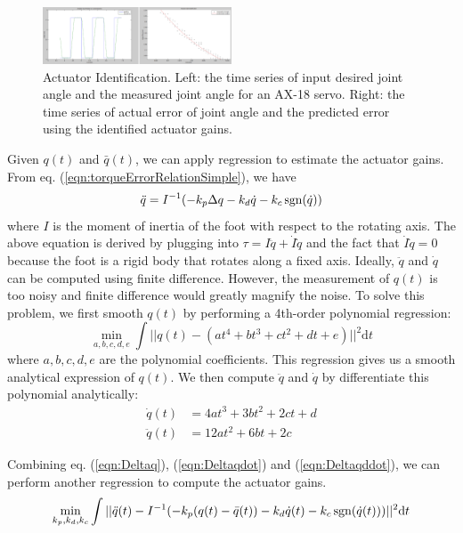 \begin{figure}[!t]
  \centering
  \includegraphics[width=0.5\textwidth]{figures/actuatorId}
  \caption{Actuator Identification. Left: the time series of input desired joint angle and the measured joint angle for an AX-18 servo. Right: the time series of actual error of joint angle and the predicted error using the identified actuator gains.  }
  \label{fig:actuatorId}
\end{figure}

Given $q(t)$ and $\bar{q}(t)$, we can apply regression to estimate the actuator gains. From eq. (\ref{eqn:torqueErrorRelationSimple}), we have
\begin{equation}
\ddot{q}=I^{-1}(-k_p\Delta q - k_d\dot{q} - k_c\operatorname{sgn}(\dot{q}))
\end{equation}
where $I$ is the moment of inertia of the foot with respect to the rotating axis. The above equation is derived by plugging into $\tau = I\ddot{q}+\dot{I}\dot{q}$ and the fact that $\dot{I}\dot{q}=0$ because the foot is a rigid body that rotates along a fixed axis. Ideally, $\ddot{q}$ and $\dot{q}$ can be computed using finite difference. However, the measurement of $q(t)$ is too noisy and finite difference would greatly magnify the noise. To solve this problem, we first smooth $q(t)$ by performing a 4th-order polynomial regression:
\begin{equation}
  \min_{a,b,c,d,e}\int ||q(t)-(at^4+bt^3+ct^2+dt+e)||^2\mathrm{d}t
  \label{eqn:Deltaq}
\end{equation}
where $a,b,c,d,e$ are the polynomial coefficients. This regression gives us a smooth analytical expression of $q(t)$. We then compute $\ddot{q}$ and $\dot{q}$ by differentiate this polynomial analytically:
\begin{align}
\label{eqn:Deltaqdot}  \dot{q}(t)&=4at^3+3bt^2+2ct+d\\
\label{eqn:Deltaqddot}  \ddot{q}(t)&=12at^2+6bt+2c
\end{align}

Combining eq. (\ref{eqn:Deltaq}), (\ref{eqn:Deltaqdot}) and (\ref{eqn:Deltaqddot}), we can perform another regression to compute the actuator gains.
\begin{equation}
\min_{k_p, k_d, k_c}\int||\ddot{q}(t)-I^{-1}(-k_p(q(t)-\bar{q}(t)) - k_d\dot{q}(t) - k_c\operatorname{sgn}(\dot{q}(t)))||^2\mathrm{d}t
\end{equation}

